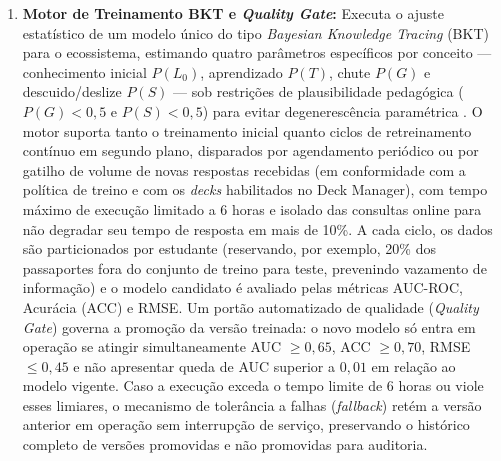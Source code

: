 \begin{enumerate}
    \item \textbf{Motor de Treinamento BKT e \textit{Quality Gate}:} Executa o ajuste estatístico de um modelo único do tipo \textit{Bayesian Knowledge Tracing} (BKT) para o ecossistema, estimando quatro parâmetros específicos por conceito — conhecimento inicial $P(L_0)$, aprendizado $P(T)$, chute $P(G)$ e descuido/deslize $P(S)$ — sob restrições de plausibilidade pedagógica ($P(G) < 0{,}5$ e $P(S) < 0{,}5$) para evitar degenerescência paramétrica \cite{pelanek_bayesian_2017}. O motor suporta tanto o treinamento inicial quanto ciclos de retreinamento contínuo em segundo plano, disparados por agendamento periódico ou por gatilho de volume de novas respostas recebidas (em conformidade com a política de treino e com os \textit{decks} habilitados no Deck Manager), com tempo máximo de execução limitado a 6 horas e isolado das consultas online para não degradar seu tempo de resposta em mais de 10\%. A cada ciclo, os dados são particionados por estudante (reservando, por exemplo, 20\% dos passaportes fora do conjunto de treino para teste, prevenindo vazamento de informação) e o modelo candidato é avaliado pelas métricas AUC-ROC, Acurácia (ACC) e RMSE. Um portão automatizado de qualidade (\textit{Quality Gate}) governa a promoção da versão treinada: o novo modelo só entra em operação se atingir simultaneamente AUC $\ge 0{,}65$, ACC $\ge 0{,}70$, RMSE $\le 0{,}45$ e não apresentar queda de AUC superior a $0{,}01$ em relação ao modelo vigente. Caso a execução exceda o tempo limite de 6 horas ou viole esses limiares, o mecanismo de tolerância a falhas (\textit{fallback}) retém a versão anterior em operação sem interrupção de serviço, preservando o histórico completo de versões promovidas e não promovidas para auditoria.


\end{enumerate}
